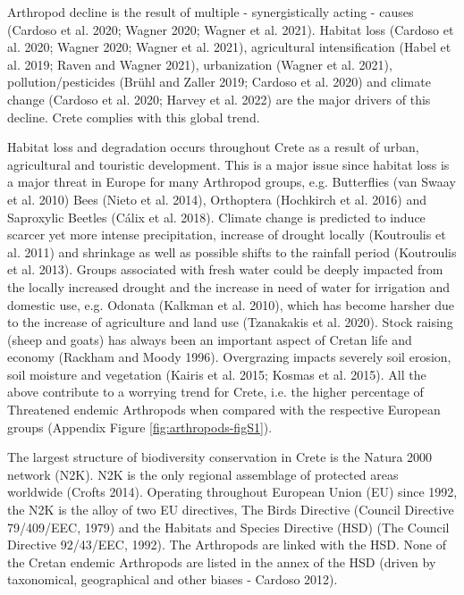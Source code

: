 Arthropod decline is the result of multiple - synergistically acting - causes (Cardoso et al. 2020; Wagner 2020; Wagner et al. 2021).
Habitat loss (Cardoso et al. 2020; Wagner 2020; Wagner et al. 2021),
agricultural intensification (Habel et al. 2019; Raven and Wagner 2021),
urbanization (Wagner et al. 2021), pollution/pesticides (Brühl and Zaller 2019; Cardoso et al. 2020)
and climate change (Cardoso et al. 2020; Harvey et al. 2022) are the major
drivers of this decline. Crete complies with this global trend.

Habitat loss and degradation occurs throughout Crete as a result of urban,
agricultural and touristic development. This is a major issue since habitat
loss is a major threat in Europe for many Arthropod groups,
e.g. Butterflies (van Swaay et al. 2010) Bees (Nieto et al. 2014),
Orthoptera (Hochkirch et al. 2016) and Saproxylic Beetles (Cálix et al. 2018).
Climate change is predicted to induce scarcer yet more intense precipitation,
increase of drought locally (Koutroulis et al. 2011) and shrinkage as well as
possible shifts to the rainfall period (Koutroulis et al. 2013). Groups
associated with fresh water could be deeply impacted from the locally increased
drought and the increase in need of water for irrigation and domestic use,
e.g. Odonata (Kalkman et al. 2010), which has become harsher due to the
increase of agriculture and land use (Tzanakakis et al. 2020). Stock raising
(sheep and goats) has always been an important aspect of Cretan life and
economy (Rackham and Moody 1996). Overgrazing impacts severely soil erosion,
soil moisture and vegetation (Kairis et al. 2015; Kosmas et al. 2015). All the
above contribute to a worrying trend for Crete, i.e. the higher percentage of
Threatened endemic Arthropods when compared with the respective European
groups (Appendix Figure \ref{fig:arthropods-figS1}).

The largest structure of biodiversity conservation in Crete is the Natura 2000
network (N2K). N2K is the only regional assemblage of protected areas
worldwide (Crofts 2014). Operating throughout European Union (EU) since 1992,
the N2K is the alloy of two EU directives, The Birds Directive (Council Directive 79/409/EEC, 1979)
and the Habitats and Species Directive (HSD) (The Council Directive 92/43/EEC, 1992).
The Arthropods are linked with the HSD. None of the Cretan endemic Arthropods
are listed in the annex of the HSD (driven by taxonomical, geographical and
other biases - Cardoso 2012).

